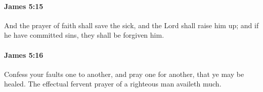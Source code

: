 		\paragraph{James 5:15} %
			\label{JAMES-5-15}

			And the prayer of faith shall save the sick, and the Lord shall raise him up; and if he have committed sins, they shall be forgiven him.

			\begin{framed}
			\scriptsize
				\begin{compactdesc}
					\item[SBLG] 
				\end{compactdesc}
			\end{framed}

		\paragraph{James 5:16} %
			\label{JAMES-5-16}

			Confess your faults one to another, and pray one for another, that ye may be healed. The effectual fervent prayer of a righteous man availeth much.

